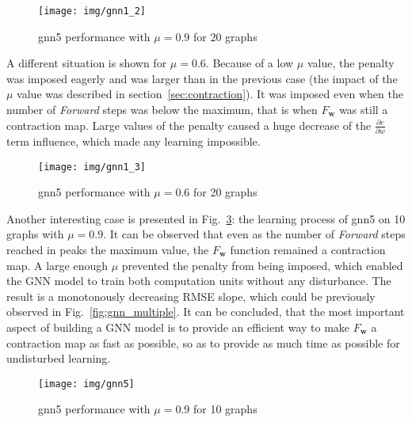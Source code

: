 \begin{figure}[h!]
\begin{center}
	\texttt{[image: img/gnn1\_2]}
	\caption{gnn5 performance with $\mu = 0.9$ for 20 graphs}
	\label{fig:gnn5_09}
\end{center}
\end{figure}

A different situation is shown for $\mu = 0.6$. Because of a low $\mu$ value, the penalty was imposed eagerly and was larger than in the previous case (the impact of the $\mu$ value was described in section~\ref{sec:contraction}). It was imposed even when the number of \emph{Forward} steps was below the maximum, that is when $F_{\bm{w}}$ was still a contraction map. Large values of the penalty caused a huge decrease of the $\frac{\partial e}{\partial w}$ term influence, which made any learning impossible.

\begin{figure}[h!]
\begin{center}
	\texttt{[image: img/gnn1\_3]}
	\caption{gnn5 performance with $\mu = 0.6$ for 20 graphs}
	\label{fig:gnn5_06}
\end{center}
\end{figure}

\newpage
Another interesting case is presented in Fig.~\ref{fig:gnn5_09_10}: the learning process of gnn5 on 10 graphs with $\mu = 0.9$. It can be observed that even as the number of \emph{Forward} steps reached in peaks the maximum value, the $F_{\bm{w}}$ function remained a contraction map. A large enough $\mu$ prevented the penalty from being imposed, which enabled the GNN model to train both computation units without any disturbance. The result is a monotonously decreasing RMSE slope, which could be previously observed in Fig.~\ref{fig:gnn_multiple}. It can be concluded, that the most important aspect of building a GNN model is to provide an efficient way to make $F_{\bm{w}}$ a contraction map as fast as possible, so as to provide as much time as possible for undisturbed learning.

\newpage
\begin{figure}[h!]
\begin{center}
	\texttt{[image: img/gnn5]}
	\caption{gnn5 performance with $\mu = 0.9$ for 10 graphs}
	\label{fig:gnn5_09_10}
\end{center}
\end{figure}

\newpage
